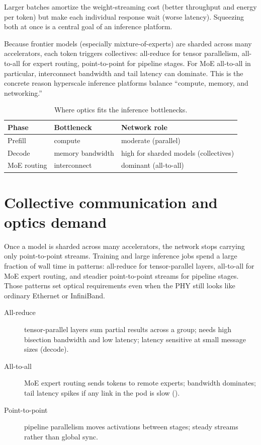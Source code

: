  Larger batches amortize the
weight-streaming cost (better throughput and energy per token) but make each
individual response wait (worse latency). Squeezing both at once is a central goal
of an inference platform.

 Because frontier
models (especially mixture-of-experts) are sharded across many accelerators,
each token triggers collectives: all-reduce for tensor parallelism, all-to-all
for expert routing, point-to-point for pipeline stages. For MoE all-to-all in
particular, interconnect bandwidth and tail latency can dominate. This is the
concrete reason hyperscale inference platforms balance ``compute, memory, and
networking.''

\begin{table}[ht]
\centering
\caption{Where optics fits the inference bottlenecks.\label{tab:inference}}
\renewcommand{\arraystretch}{1.25}%
\begin{tabular}{@{}lll@{}}
\toprule
Phase & Bottleneck & Network role \\
\midrule
Prefill & compute & moderate (parallel) \\
\addlinespace[1.5em]
Decode & memory bandwidth & high for sharded models (collectives) \\
\addlinespace[1.5em]
MoE routing & interconnect & dominant (all-to-all) \\
\bottomrule
\end{tabular}
\end{table}

\section{Collective communication and optics demand}
\label{sec:collectives}

Once a model is sharded across many accelerators, the network stops carrying only
point-to-point streams. Training and large inference jobs spend a large fraction
of wall time in  patterns: all-reduce for tensor-parallel layers,
all-to-all for MoE expert routing, and steadier point-to-point streams for pipeline
stages. Those patterns set optical requirements even when the PHY still looks like
ordinary Ethernet or InfiniBand.

\begin{description}
\item[All-reduce] tensor-parallel layers sum partial results across a group; needs
      high bisection bandwidth and low latency; latency sensitive at small message
      sizes (decode).
\item[All-to-all] MoE expert routing sends tokens to remote experts; bandwidth
      dominates; tail latency spikes if any link in the pod is slow
      ().
\item[Point-to-point] pipeline parallelism moves activations between stages; steady
      streams rather than global sync.
\end{description}

